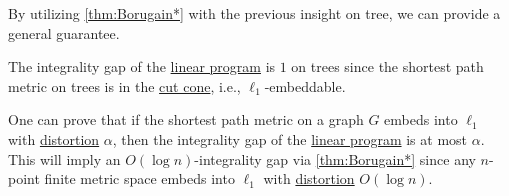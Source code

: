 By utilizing \autoref{thm:Borugain*} with the previous insight on tree, we can provide a general guarantee.

\begin{prev}
	The integrality gap of the \hyperref[eq:non-uniform-sparsest-cut-LP-primal]{linear program} is \(1\) on trees since the shortest path metric on trees is in the \hyperref[def:cut-cone]{cut cone}, i.e., \(\ell _1\)-embeddable.
\end{prev}

One can prove that if the shortest path metric on a graph \(G\) embeds into \(\ell _1\) with \hyperref[def:distortion]{distortion} \(\alpha \), then the integrality gap of the \hyperref[eq:non-uniform-sparsest-cut-LP-primal]{linear program} is at most \(\alpha \). This will imply an \(O(\log n)\)-integrality gap via \autoref{thm:Borugain*} since any \(n\)-point finite metric space embeds into \(\ell _1\) with \hyperref[def:distortion]{distortion} \(O(\log n)\).